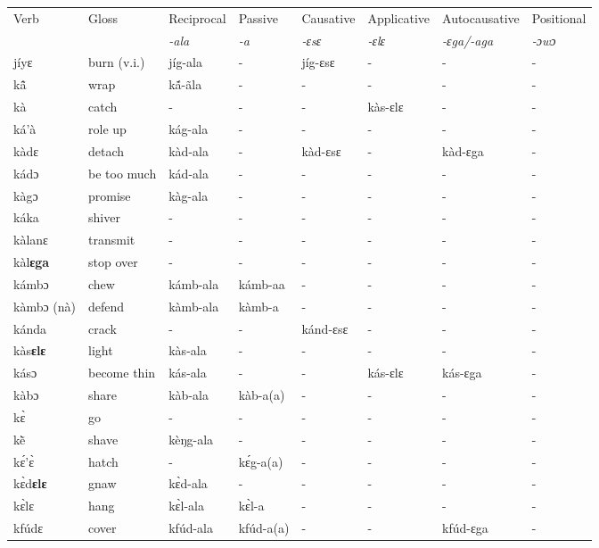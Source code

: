 \begin{sidewaystable}
\begin{tabular}{llllllll}
 \lsptoprule
 Verb & Gloss & Reciprocal & Passive  & Causative  & Applicative   & Autocausative & Positional   \\
  &    & {\itshape -ala} & {\itshape -a} & {\itshape -ɛsɛ} & {\itshape -ɛlɛ} & {\itshape -ɛga/-aga}  & {\itshape -ɔwɔ}  \\
\midrule
jíyɛ & burn (v.i.) & jíg-ala & - & jíg-ɛsɛ & - & - & - \\
kã̂ & wrap & kã́-ãla & - & - & - & - & - \\
kà & catch & - & - & - & kàs-ɛlɛ & - & - \\
ká'à & role up & kág-ala & - & - & - & - & - \\
kàdɛ & detach & kàd-ala & - & kàd-ɛsɛ & - &  kàd-ɛga & - \\
kádɔ & be too much & kád-ala & - & - & - & - & - \\
kàgɔ & promise & kàg-ala & - & - & - & - & - \\
káka & shiver & - &  - & - & - & - & - \\
kàlanɛ & transmit & - & - & - & - & - & - \\
kàl{\bfseries ɛga}  & stop over & - & - & - & - & - & - \\
kámbɔ & chew & kámb-ala & kámb-aa & - & - & - &  - \\
kàmbɔ (nà) & defend & kàmb-ala & kàmb-a & - & - & - & - \\
kánda & crack & - & - & kánd-ɛsɛ & - & - & - \\
kàs{\bfseries ɛlɛ} & light & kàs-ala & - & - & - & - & - \\
kásɔ & become thin & kás-ala & - & - &  kás-ɛlɛ & kás-ɛga & - \\
kàbɔ & share & kàb-ala & kàb-a(a) & - & - & - & - \\
kɛ̀ & go &  - & - & - & - & - & - \\
kẽ̀ & shave & kèŋg-ala & - & - & - & - & - \\
kɛ́'ɛ̀ & hatch & - & kɛ́g-a(a) & - & - & - & - \\
kɛ̀d{\bfseries ɛlɛ} & gnaw & kɛ̀d-ala & - & - & - & - & - \\
kɛ̀lɛ & hang & kɛ̀l-ala & kɛ̀l-a & - & - & - & - \\ 
kfúdɛ & cover & kfúd-ala & kfúd-a(a) & - & - & kfúd-ɛga & - \\
\midrule\end{tabular}\end{sidewaystable}

